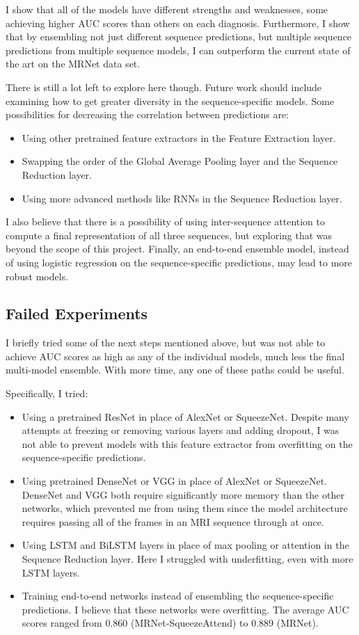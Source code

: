 \documentclass[10pt,twocolumn,letterpaper]{article}
\begin{document}
I show that all of the models have different strengths and weaknesses, some achieving higher AUC scores than others on each diagnosis. Furthermore, I show that by ensembling not just different sequence predictions, but multiple sequence predictions from multiple sequence models, I can outperform the current state of the art on the MRNet data set.

There is still a lot left to explore here though. Future work should include examining how to get greater diversity in the sequence-specific models. Some possibilities for decreasing the correlation between predictions are:
\begin{itemize}
\item Using other pretrained feature extractors in the Feature Extraction layer.
\item Swapping the order of the Global Average Pooling layer and the Sequence
Reduction layer.
\item Using more advanced methods like RNNs in the Sequence Reduction layer.
\end{itemize}

I also believe that there is a possibility of using inter-sequence attention to compute a final representation of all three sequences, but exploring that was beyond the scope of this project. Finally, an end-to-end ensemble model, instead of using logistic regression on the sequence-specific predictions, may lead to more robust models.

\subsection{Failed Experiments}
I briefly tried some of the next steps mentioned above, but was not able to achieve AUC scores as high as any of the individual models, much less the final multi-model ensemble. With more time, any one of these paths could be useful.

Specifically, I tried:
\begin{itemize}
   \item Using a pretrained ResNet in place of AlexNet or SqueezeNet. Despite many attempts at freezing or removing various layers and adding dropout, I was not able to prevent models with this feature extractor from overfitting on the sequence-specific predictions.
   \item Using pretrained DenseNet or VGG in place of AlexNet or SqueezeNet. DenseNet and VGG both require significantly more memory than the other networks, which prevented me from using them since the model architecture requires passing all of the frames in an MRI sequence through at once.
   \item Using LSTM and BiLSTM layers in place of max pooling or attention in the Sequence Reduction layer. Here I struggled with underfitting, even with more LSTM layers.
   \item Training end-to-end networks instead of ensembling the sequence-specific predictions. I believe that these networks were overfitting. The average AUC scores ranged from 0.860 (MRNet-SqueezeAttend) to 0.889 (MRNet).
\end{itemize}
\end{document}
